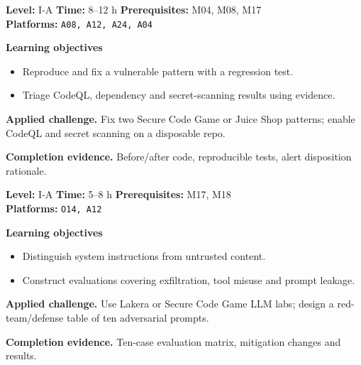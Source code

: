 \documentclass[10pt,letterpaper,oneside]{article}
\begin{document}
\vspace{2.5pt}
\begin{skillbox}[title={M18 \quad Secure coding and vulnerability triage}]
\textbf{Level:} I-A \quad \textbf{Time:} 8--12 h \quad \textbf{Prerequisites:} M04, M08, M17\\
\textbf{Platforms:} \texttt{A08, A12, A24, A04}\par
\textbf{Learning objectives}
\begin{itemize}
\item Reproduce and fix a vulnerable pattern with a regression test.
\item Triage CodeQL, dependency and secret-scanning results using evidence.
\end{itemize}
\textbf{Applied challenge.} Fix two Secure Code Game or Juice Shop patterns; enable CodeQL and secret scanning on a disposable repo.\par
\textbf{Completion evidence.} Before/after code, reproducible tests, alert disposition rationale.\par
\end{skillbox}
\vspace{2.5pt}
\begin{skillbox}[title={M19 \quad Prompt-injection defense}]
\textbf{Level:} I-A \quad \textbf{Time:} 5--8 h \quad \textbf{Prerequisites:} M17, M18\\
\textbf{Platforms:} \texttt{O14, A12}\par
\textbf{Learning objectives}
\begin{itemize}
\item Distinguish system instructions from untrusted content.
\item Construct evaluations covering exfiltration, tool misuse and prompt leakage.
\end{itemize}
\textbf{Applied challenge.} Use Lakera or Secure Code Game LLM labs; design a red-team/defense table of ten adversarial prompts.\par
\textbf{Completion evidence.} Ten-case evaluation matrix, mitigation changes and results.\par
\end{skillbox}
\vspace{2.5pt}
\end{document}
